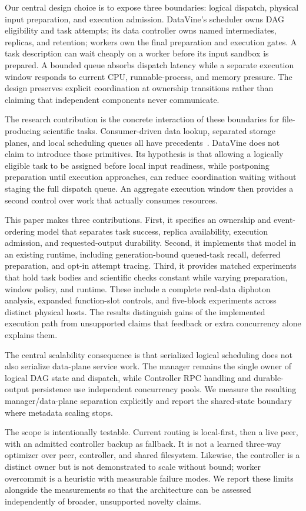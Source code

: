 Our central design choice is to expose three boundaries: logical dispatch,
physical input preparation, and execution admission. DataVine's scheduler owns
DAG eligibility and task attempts; its data controller owns named intermediates,
replicas, and retention; workers own the final preparation and execution gates.
A task description can wait cheaply on a worker before its input sandbox is
prepared. A bounded queue absorbs dispatch latency while a separate execution
window responds to current CPU, runnable-process, and memory pressure.
The design preserves explicit coordination at ownership transitions rather than
claiming that independent components never communicate.

The research contribution is the concrete interaction of these boundaries for
file-producing scientific tasks. Consumer-driven data lookup, separated storage
planes, and local scheduling queues all have precedents~\cite{hoplite,pocket,apollo}.
DataVine does not claim to introduce those primitives. Its hypothesis is that
allowing a logically eligible task to be assigned before local input readiness,
while postponing preparation until execution approaches, can reduce coordination
waiting without staging the full dispatch queue. An aggregate execution window
then provides a second control over work that actually consumes resources.

This paper makes three contributions. First, it specifies an ownership and
event-ordering model that separates task success, replica availability, execution
admission, and requested-output durability. Second, it implements that model
in an existing runtime, including generation-bound queued-task recall, deferred
preparation, and opt-in attempt tracing. Third, it provides matched experiments
that hold task bodies and scientific checks constant while varying preparation,
window policy, and runtime. These include a complete real-data diphoton analysis,
expanded function-slot controls, and five-block experiments
across distinct physical hosts. The results distinguish gains of the implemented
execution path from unsupported claims that feedback or extra concurrency
alone explains them.

The central scalability consequence is that serialized logical scheduling does
not also serialize data-plane service work. The manager remains the single
owner of logical DAG state and dispatch, while Controller RPC handling and
durable-output persistence use independent concurrency pools. We measure the
resulting manager/data-plane separation explicitly and report the shared-state
boundary where metadata scaling stops.

The scope is intentionally testable. Current routing is local-first, then a
live peer, with an admitted controller backup as fallback. It is not a learned
three-way optimizer over peer, controller, and shared filesystem. Likewise,
the controller is a distinct owner but is not demonstrated to scale without
bound; worker overcommit is a heuristic with measurable failure modes. We
report these limits alongside the measurements so that the architecture can
be assessed independently of broader, unsupported novelty claims.
